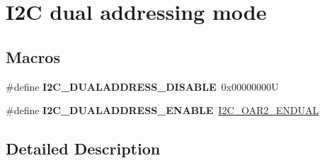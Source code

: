 \hypertarget{group___i2_c__dual__addressing__mode}{}\section{I2C dual addressing mode}
\label{group___i2_c__dual__addressing__mode}
\subsection*{Macros}
\begin{DoxyCompactItemize}
\item 
\mbox{\label{group___i2_c__dual__addressing__mode_gacb8f4a1fd543e5ef2c9e7711fc9b5a67}} 
\#define {\bfseries I2\+C\+\_\+\+D\+U\+A\+L\+A\+D\+D\+R\+E\+S\+S\+\_\+\+D\+I\+S\+A\+B\+LE}~0x00000000U
\item 
\mbox{\label{group___i2_c__dual__addressing__mode_gae33ff5305d9f38d857cff1774f481fab}} 
\#define {\bfseries I2\+C\+\_\+\+D\+U\+A\+L\+A\+D\+D\+R\+E\+S\+S\+\_\+\+E\+N\+A\+B\+LE}~\mbox{\hyperlink{group___peripheral___registers___bits___definition_gab83ed1ee64439cb2734a708445f37e94}{I2\+C\+\_\+\+O\+A\+R2\+\_\+\+E\+N\+D\+U\+AL}}
\end{DoxyCompactItemize}


\subsection{Detailed Description}
